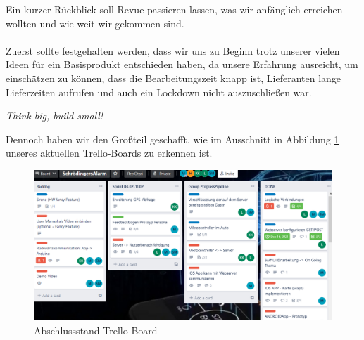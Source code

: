 
Ein kurzer Rückblick soll Revue passieren lassen, was wir anfänglich erreichen wollten und wie weit wir gekommen sind. 
\\
\\
Zuerst sollte festgehalten werden, dass wir uns zu Beginn trotz unserer vielen Ideen für ein Basisprodukt entschieden haben, da unsere Erfahrung ausreicht, um einschätzen zu können, dass die Bearbeitungszeit knapp ist, Lieferanten lange Lieferzeiten aufrufen und auch ein Lockdown nicht auszuschließen war. 

\begin{center}
	\textit{Think big, build small!} \cite{Full2022}
\end{center}
Dennoch haben wir den Großteil geschafft, wie im Ausschnitt in Abbildung \ref{trello} unseres aktuellen Trello-Boards  zu erkennen ist.
\begin{figure} [H]
	\begin{center}
		\includegraphics[width=1\textwidth]{Bilder/Rueckblick_Vergleich.png}
		\caption{Abschlussstand Trello-Board}
		\label{trello}
	\end{center}
\end{figure}



